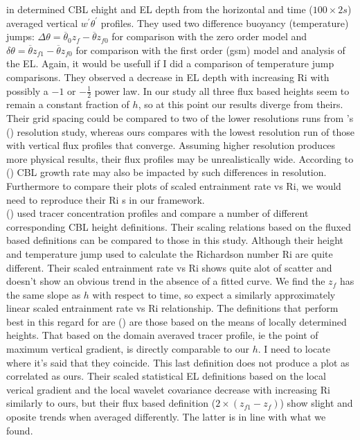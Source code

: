 \citeauthor{FedConzMir04} in \cite{FedConzMir04} determined \acs{CBL} ehight and \acs{EL} depth from the horizontal and time ($100 \times 2s$) averaged vertical $w^{'}\theta^{'}$ profiles.  They used two difference buoyancy (temperature) jumps: $\Delta \theta = \overline{\theta}_{0}z_{f} - \overline{\theta}z_{f0}$ for comparison with the zero order model and $\delta \theta = \overline{\theta}z_{f1} - \overline{\theta}z_{f0}$ for comparison with the first order (gsm) model and analysis of the \acs{EL}.  Again, it would be usefull if I did a comparison of temperature jump comparisons.  They observed a decrease in \acs{EL} depth with increasing \acs{Ri} with possibly a $-1$ or $-\frac{1}{2}$ power law.  In our study all three flux based heights seem to remain a constant fraction of $h$, so at this point our results diverge from theirs.  Their grid spacing could be compared to two of the lower resolutions runs from \citeauthor{SullPat}'s (\cite{SullPat}) resolution study, whereas ours compares with the lowest resolution run of those with vertical flux profiles that converge.  Assuming higher resolution produces more physical results, their flux profiles may be unrealistically wide.  According to \citeauthor{SullPat} (\cite{SullPat}) \acs{CBL} growth rate may also be impacted by such differences in resolution.  Furthermore to compare their plots of scaled entrainment rate vs \acs{Ri}, we would need to reproduce their \acs{Ri} s in our framework.
\\
\citeauthor{BrooksFowler2} (\cite{BrooksFowler2}) used tracer concentration profiles and compare a number of different corresponding \acs{CBL} height definitions.  Their scaling relations based on the fluxed based definitions can be compared to those in this study. Although their height and temperature jump used to calculate the Richardson number \acs{Ri} are quite different.  Their scaled entrainment rate vs \acs{Ri} shows quite alot of scatter and doesn't show an obvious trend in the absence of a fitted curve.  We find the $z_{f}$ has the same slope as $h$ with respect to time, so expect a similarly approximately linear scaled entrainment rate vs \acs{Ri} relationship. The definitions that perform best in this regard for are \citeauthor{BrooksFowler2} (\cite{BrooksFowler2}) are those based on the means of locally determined heights.  That based on the domain averaved tracer profile, ie the point of maximum vertical gradient, is directly comparable to our $h$.  I need to locate where it's said that they coincide.  This last definition does not produce a plot as correlated as ours.  Their scaled statistical \acs{EL} definitions based on the local verical gradient and the local wavelet covariance decrease with increasing \acs{Ri} similarly to ours, but their flux based definition ($2\times(z_{f1}-z_{f})$) show slight and oposite trends when averaged differently.  The latter is in line with what we found.\\

